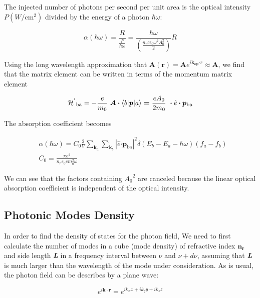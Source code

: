 The injected number of photons per second per unit area is the optical
intensity \(P(W/\text{cm}^{2})\) divided by the energy of a photon
\(\hbar\omega\):

\begin{equation}
\alpha\left( \hbar\omega \right) = \frac{R}{\frac{P}{\hbar\omega}} = \frac{\hbar\omega}{(\frac{n_{r}c\epsilon_{0}\omega^{2}A_{0}^{2}}{2})}R
\end{equation}

Using the long wavelength approximation that
\(\bm{A}\left( \bm{r} \right) = \bm{A}e^{i\bm{k}_{\bm{\text{op}}}\bm{\cdot}r}\bm{\approx A}\),
we find that the matrix element can be written in terms of the momentum
matrix element

\begin{equation}
{\mathcal{H}^{'}}_{\text{ba}} = - \frac{e}{m_{0}}\bm{\ A \cdot}\left\langle b \middle| \bm{p} \middle| a \right\rangle\bm{=}\frac{eA_{0}}{2m_{0}}\bm{\  \cdot}\hat{e}\bm{\cdot}\bm{p}_{\text{ba}}
\end{equation}

The absorption coefficient becomes

\begin{eqnarray}
  & \alpha\left( \hbar\omega \right) = C_{0}\frac{2}{V}\sum_{\bm{k}_{a}}^{}{\sum_{\bm{k}_{b}}^{}\left| \hat{e}\bm{\cdot}\bm{p}_{\text{ba}} \right|^{2}}\delta(E_{b} - E_{a} - \hbar\omega)(f_{a} - f_{b}) \nonumber \\
  & C_{0} = \frac{\pi e^{2}}{n_{r}\varepsilon_{0}cm_{0}^{2}\omega}
\end{eqnarray}

We can see that the factors containing ${A_0}^2$ are canceled because the
linear optical absorption coefficient is independent of the optical intensity.

\subsection{Photonic Modes Density}\label{photonic-density-of-states}

In order to find the density of states for the photon field, We need to
first calculate the number of modes in a cube (mode density) of
refractive index \(\mathbf{n}_{\mathbf{r}}\) and side length \emph{\textbf{L}}
in a frequency interval between \(\nu\) and \(\nu + d\nu\), assuming
that \emph{\textbf{L}} is much larger than the wavelength of the mode
under consideration. As is usual, the photon field can be describes by a
plane wave:

\begin{equation}
  e^{i\bm{k}\cdot\bm{r}} = e^{ik_{x}x + ik_{y}y + ik_{z}z}
\end{equation}

